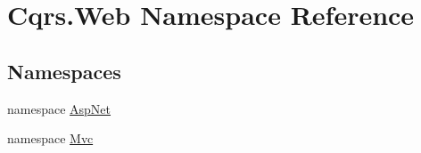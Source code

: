 \hypertarget{namespaceCqrs_1_1Web}{}\section{Cqrs.\+Web Namespace Reference}
\label{namespaceCqrs_1_1Web}
\subsection*{Namespaces}
\begin{DoxyCompactItemize}
\item 
namespace \hyperlink{namespaceCqrs_1_1Web_1_1AspNet}{Asp\+Net}
\item 
namespace \hyperlink{namespaceCqrs_1_1Web_1_1Mvc}{Mvc}
\end{DoxyCompactItemize}
